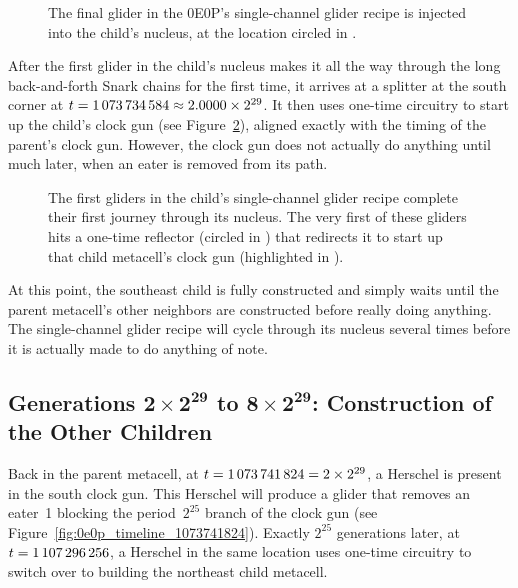 \begin{figure}[!htb]
	\centering
	\caption{The final glider in the 0E0P's single-channel glider recipe is injected into the child's nucleus, at the location circled in .}
	\label{fig:0e0p_timeline_974368517}
\end{figure}

After the first glider in the child's nucleus makes it all the way through the long back-and-forth Snark chains for the first time, it arrives at a splitter at the south corner at $t = 1{\,}073{\,}734{\,}584 \approx 2.0000 \times 2^{29}$. It then uses one-time circuitry to start up the child's clock gun (see Figure~\ref{fig:0e0p_timeline_1073734584}), aligned exactly with the timing of the parent's clock gun. However, the clock gun does not actually do anything until much later, when an eater is removed from its path.

\begin{figure}[!htb]
	\centering
	\caption{The first gliders in the child's single-channel glider recipe complete their first journey through its nucleus. The very first of these gliders hits a one-time reflector (circled in ) that redirects it to start up that child metacell's clock gun (highlighted in ).}
	\label{fig:0e0p_timeline_1073734584}
\end{figure}

At this point, the southeast child is fully constructed and simply waits until the parent metacell's other neighbors are constructed before really doing anything. The single-channel glider recipe will cycle through its nucleus several times before it is actually made to do anything of note.


\subsection{Generations $\mathbf{2 \times 2^{29}}$ to $\mathbf{8 \times 2^{29}}$: Construction of the Other Children}\label{sec:0e0p_timeline_other_child}

Back in the parent metacell, at $t = 1{\,}073{\,}741{\,}824 = 2 \times 2^{29}$, a Herschel is present in the south clock gun. This Herschel will produce a glider that removes an eater~1 blocking the period~$2^{25}$ branch of the clock gun (see Figure~\ref{fig:0e0p_timeline_1073741824}). Exactly $2^{25}$ generations later, at $t = 1{\,}107{\,}296{\,}256$, a Herschel in the same location uses one-time circuitry to switch over to building the northeast child metacell.


